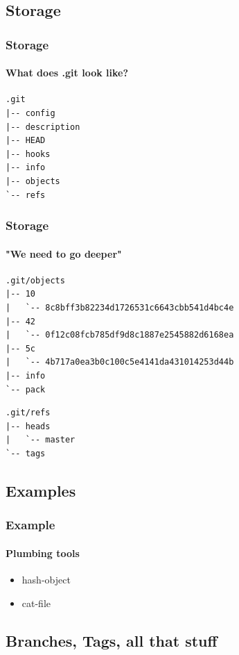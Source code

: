 \documentclass{beamer}
\begin{document}
    \subsection{Storage}

    \begin{frame}[fragile]
	    \frametitle{Storage}
	    \framesubtitle{What does .git look like?}
        \begin{verbatim}
.git
|-- config
|-- description
|-- HEAD
|-- hooks
|-- info
|-- objects
`-- refs
        \end{verbatim}
	\end{frame}

	\begin{frame}[fragile]
	    \frametitle{Storage}
	    \framesubtitle{"We need to go deeper"}
\begin{verbatim}
.git/objects
|-- 10
|   `-- 8c8bff3b82234d1726531c6643cbb541d4bc4e
|-- 42
|   `-- 0f12c08fcb785df9d8c1887e2545882d6168ea
|-- 5c
|   `-- 4b717a0ea3b0c100c5e4141da431014253d44b
|-- info
`-- pack
\end{verbatim}
\pause
\begin{verbatim}
.git/refs
|-- heads
|   `-- master
`-- tags
\end{verbatim}
	\end{frame}

	\subsection{Examples}

    \begin{frame}
        \frametitle{Example}
        \framesubtitle{Plumbing tools}

        \begin{itemize}
            \item hash-object
            \item cat-file
        \end{itemize}

    \end{frame}

	\subsection{Branches, Tags, all that stuff}
\end{document}
